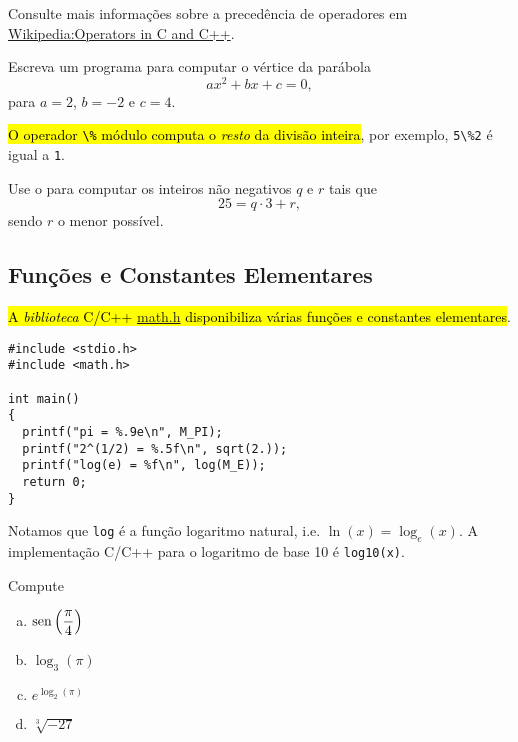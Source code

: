\documentclass[12pt]{article}
\begin{document}
\begin{obs}
Consulte mais informações sobre a precedência de operadores em \href{https://en.wikipedia.org/wiki/Operators_in_C_and_C\%2B\%2B#Operator_precedence}{Wikipedia:Operators in C and C++}.
\end{obs}

\begin{exr}
  Escreva um programa para computar o vértice da parábola
  \begin{equation}
    ax^2 + bx + c = 0,
  \end{equation}
  para $a = 2$, $b = -2$ e $c = 4$. 
\end{exr}

\hl{O operador {\lstinline+\%+} módulo computa o \emph{resto} da divisão inteira}, por exemplo, \lstinline+5\%2+ é igual a \lstinline+1+.

\begin{exr}
  Use o {\python} para computar os inteiros não negativos $q$ e $r$ tais que
  \begin{equation}
    25 = q\cdot 3 + r,
  \end{equation}
  sendo $r$ o menor possível.
\end{exr}

\subsection{Funções e Constantes Elementares}

\hl{A \emph{biblioteca} C/C++ {\href{https://cplusplus.com/reference/cmath}{math.h}} disponibiliza várias funções e constantes elementares}.
\begin{lstlisting}[caption=mat.cc]
#include <stdio.h>
#include <math.h>

int main()
{
  printf("pi = %.9e\n", M_PI);
  printf("2^(1/2) = %.5f\n", sqrt(2.));
  printf("log(e) = %f\n", log(M_E));
  return 0;
}
\end{lstlisting}

\begin{obs}
  Notamos que \lstinline+log+ é a função logaritmo natural, i.e. $\ln(x) = \log_e(x)$. A implementação C/C++ para o logaritmo de base 10 é \lstinline!log10(x)!.
\end{obs}

\begin{exr}
  Compute
  \begin{enumerate}[a)]
  \item $\displaystyle \operatorname{sen}\left(\frac{\pi}{4}\right)$
  \item $\displaystyle \log_3(\pi)$
  \item $\displaystyle e^{\log_2(\pi)}$
  \item $\displaystyle \sqrt[3]{-27}$
  \end{enumerate}
\end{exr}
\end{document}
